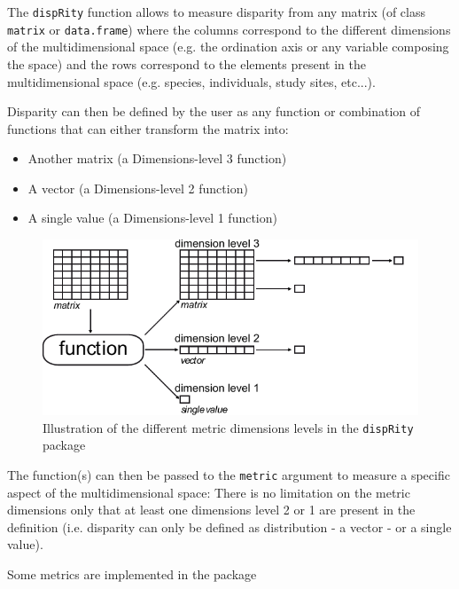 \documentclass[12pt,letterpaper]{article}
\newcommand{\disp}{\texttt{dispRity} }
\begin{document}
The \disp function allows to measure disparity from any matrix (of class \texttt{matrix} or \texttt{data.frame}) where the columns correspond to the different dimensions of the multidimensional space (e.g. the ordination axis or any variable composing the space) and the rows correspond to the elements present in the multidimensional space (e.g. species, individuals, study sites, etc...).

Disparity can then be defined by the user as any function or combination of functions that can either transform the matrix into:
\begin{itemize}
    \item Another matrix (a Dimensions-level 3 function)
    \item A vector (a Dimensions-level 2 function)
    \item A single value (a Dimensions-level 1 function)
\end{itemize}

\begin{figure}[!htbp]
\centering
   \includegraphics[width=1\textwidth]{../inst/gitbook/dispRity_fun.pdf} 
\caption{Illustration of the different metric dimensions levels in the \disp package}
\label{Fig:levels}
\end{figure}

The function(s) can then be passed to the \texttt{metric} argument to measure a specific aspect of the multidimensional space:
There is no limitation on the metric dimensions only that at least one dimensions level 2 or 1 are present in the definition (i.e. disparity can only be defined as distribution - a vector - or a single value).

Some metrics are implemented in the package
\end{document}
